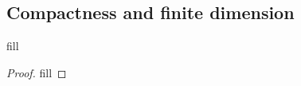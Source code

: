 \subsection{Compactness and finite dimension}

\begin{exercise}{1}
fill
\end{exercise}
\begin{proof}
fill
\end{proof}